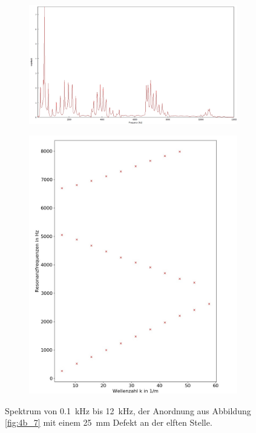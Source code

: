 \begin{figure}
\centering
\begin{subfigure}{0.65\textwidth}
\includegraphics[width=\textwidth]{content/messungen/Chapter4b/4b_7_2b.jpg}
\end{subfigure}
\begin{subfigure}{0.34\textwidth}
\includegraphics[width=\textwidth]{content/Scripts/4b_7_2b.jpg}
\end{subfigure}
\caption{Spektrum von 0.1~kHz bis 12~kHz, der Anordnung aus Abbildung \ref{fig:4b_7} mit einem 25~mm Defekt an der elften Stelle.}
\label{fig:4b_7_2b}
\end{figure}
